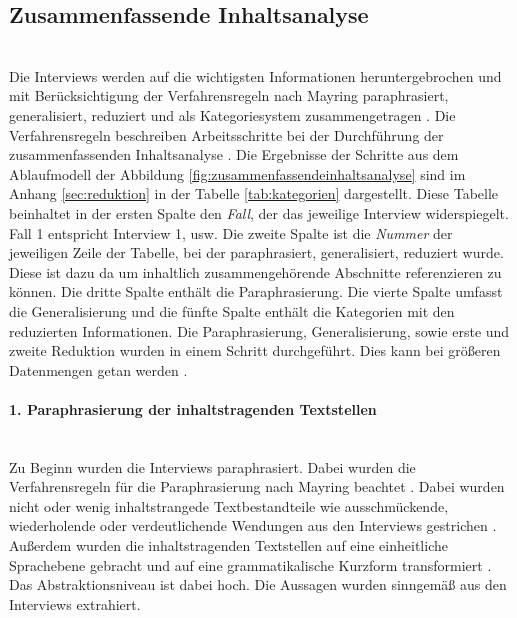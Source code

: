 %	
%	
%	
%	
\subsection*{Zusammenfassende Inhaltsanalyse}\mbox{} \\
Die Interviews werden auf die wichtigsten Informationen heruntergebrochen und mit Berücksichtigung der Verfahrensregeln nach Mayring paraphrasiert, generalisiert, reduziert und als Kategoriesystem zusammengetragen \cite{mayring1994qualitative}. Die Verfahrensregeln beschreiben Arbeitsschritte bei der Durchführung der zusammenfassenden Inhaltsanalyse \cite{mayring1994qualitative}. Die Ergebnisse der Schritte aus dem Ablaufmodell der Abbildung \ref{fig:zusammenfassendeinhaltsanalyse} sind im Anhang \ref{sec:reduktion} in der Tabelle \ref{tab:kategorien} dargestellt. Diese Tabelle beinhaltet in der ersten Spalte den \emph{Fall}, der das jeweilige Interview widerspiegelt. Fall 1 entspricht Interview 1, usw. Die zweite Spalte ist die \emph{Nummer} der jeweiligen Zeile der Tabelle, bei der paraphrasiert, generalisiert, reduziert wurde. Diese ist dazu da um inhaltlich zusammengehörende Abschnitte referenzieren zu können. Die dritte Spalte enthält die Paraphrasierung. Die vierte Spalte umfasst die Generalisierung und die fünfte Spalte enthält die Kategorien mit den reduzierten Informationen. Die Paraphrasierung, Generalisierung, sowie erste und zweite Reduktion wurden in einem Schritt durchgeführt. Dies kann bei größeren Datenmengen getan werden \cite{mayring2019qualitative}.
\paragraph{1. Paraphrasierung der inhaltstragenden Textstellen}\mbox{} \\
Zu Beginn wurden die Interviews paraphrasiert. Dabei wurden die Verfahrensregeln für die Paraphrasierung nach Mayring beachtet \cite{mayring2019qualitative}. Dabei wurden nicht oder wenig inhaltstrangede Textbestandteile wie ausschmückende, wiederholende oder verdeutlichende Wendungen aus den Interviews gestrichen \cite{mayring2019qualitative}. Außerdem wurden die inhaltstragenden Textstellen auf eine einheitliche Sprachebene gebracht und auf eine grammatikalische Kurzform transformiert \cite{mayring2019qualitative}. Das Abstraktionsniveau ist dabei hoch. Die Aussagen wurden sinngemäß aus den Interviews extrahiert.
